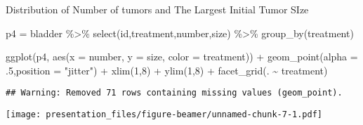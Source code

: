 \documentclass[
  ignorenonframetext,
]{beamer}
\newenvironment{Shaded}{\begin{snugshade}}{\end{snugshade}}
\newcommand{\AttributeTok}[1]{\textcolor[rgb]{0.77,0.63,0.00}{#1}}
\newcommand{\DecValTok}[1]{\textcolor[rgb]{0.00,0.00,0.81}{#1}}
\newcommand{\FunctionTok}[1]{\textcolor[rgb]{0.00,0.00,0.00}{#1}}
\newcommand{\NormalTok}[1]{#1}
\newcommand{\OtherTok}[1]{\textcolor[rgb]{0.56,0.35,0.01}{#1}}
\newcommand{\SpecialCharTok}[1]{\textcolor[rgb]{0.00,0.00,0.00}{#1}}
\newcommand{\StringTok}[1]{\textcolor[rgb]{0.31,0.60,0.02}{#1}}
\begin{document}
\begin{frame}[fragile]{Distribution of Number of tumors and The Largest
Initial Tumor SIze}
\protect\hypertarget{distribution-of-number-of-tumors-and-the-largest-initial-tumor-size}{}
\begin{Shaded}
\begin{Highlighting}[]
\NormalTok{p4 }\OtherTok{=}\NormalTok{  bladder }\SpecialCharTok{\%\textgreater{}\%} \FunctionTok{select}\NormalTok{(id,treatment,number,size) }\SpecialCharTok{\%\textgreater{}\%} \FunctionTok{group\_by}\NormalTok{(treatment)}

\FunctionTok{ggplot}\NormalTok{(p4, }\FunctionTok{aes}\NormalTok{(}\AttributeTok{x =}\NormalTok{ number, }\AttributeTok{y =}\NormalTok{ size, }\AttributeTok{color =}\NormalTok{ treatment)) }\SpecialCharTok{+} 
  \FunctionTok{geom\_point}\NormalTok{(}\AttributeTok{alpha =}\NormalTok{ .}\DecValTok{5}\NormalTok{,}\AttributeTok{position =} \StringTok{"jitter"}\NormalTok{) }\SpecialCharTok{+}
  \FunctionTok{xlim}\NormalTok{(}\DecValTok{1}\NormalTok{,}\DecValTok{8}\NormalTok{) }\SpecialCharTok{+}
  \FunctionTok{ylim}\NormalTok{(}\DecValTok{1}\NormalTok{,}\DecValTok{8}\NormalTok{) }\SpecialCharTok{+}
  \FunctionTok{facet\_grid}\NormalTok{(. }\SpecialCharTok{\textasciitilde{}}\NormalTok{ treatment)}
\end{Highlighting}
\end{Shaded}

\begin{verbatim}
## Warning: Removed 71 rows containing missing values (geom_point).
\end{verbatim}

\texttt{[image: presentation\_files/figure-beamer/unnamed-chunk-7-1.pdf]}
\end{frame}
\end{document}
